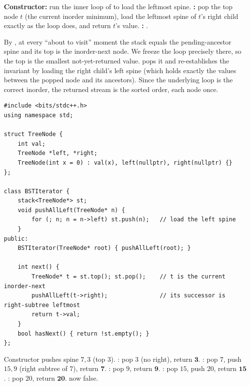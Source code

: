 \textbf{Constructor:} run the inner loop of  to load the
leftmost spine. \textbf{:} pop the top node $t$ (the current inorder
minimum), load the leftmost spine of $t$'s right child exactly as the loop does, and
return $t$'s value. \textbf{:} .

\begin{proofbox}
By , at every ``about to visit'' moment the stack equals the
pending-ancestor spine and its top is the inorder-next node. We freeze the loop precisely
there, so the top is the smallest not-yet-returned value.  pops it and
re-establishes the invariant by loading the right child's left spine (which holds exactly
the values between the popped node and its ancestors). Since the underlying loop is the
correct inorder, the returned stream is the sorted order, each node once.
\end{proofbox}

\begin{lstlisting}[caption={BST Iterator (LeetCode 173)}, label={lst:c03-bst-iter}]
#include <bits/stdc++.h>
using namespace std;

struct TreeNode {
    int val;
    TreeNode *left, *right;
    TreeNode(int x = 0) : val(x), left(nullptr), right(nullptr) {}
};

class BSTIterator {
    stack<TreeNode*> st;
    void pushAllLeft(TreeNode* n) {
        for (; n; n = n->left) st.push(n);   // load the left spine
    }
public:
    BSTIterator(TreeNode* root) { pushAllLeft(root); }

    int next() {
        TreeNode* t = st.top(); st.pop();    // t is the current inorder-next
        pushAllLeft(t->right);               // its successor is right-subtree leftmost
        return t->val;
    }
    bool hasNext() { return !st.empty(); }
};
\end{lstlisting}

\begin{tracebox}[On BST \code{[7,3,15,null,null,9,20]} (sorted inorder $=3,7,9,15,20$)]
Constructor pushes spine $7,3$ (top $3$). : pop $3$ (no right), return
$\mathbf{3}$. : pop $7$, push $15,9$ (right subtree of $7$), return
$\mathbf{7}$. : pop $9$, return $\mathbf{9}$. : pop $15$, push
$20$, return $\mathbf{15}$. : pop $20$, return $\mathbf{20}$.
 now false.
\end{tracebox}

